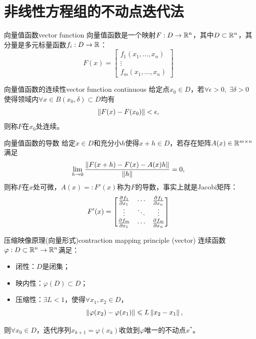 \section{非线性方程组的不动点迭代法}

\begin{definition}
    {向量值函数}{vector function}
    向量值函数是一个映射$F:D\to\mathbb R^n$，其中$D\subset\mathbb R^n$，其分量是多元标量函数$f_i:D\to\mathbb R$：
    \begin{equation}
        F(x)=\begin{bmatrix}
            f_1(x_1,\ldots,x_n)\\\vdots\\f_m(x_1,\ldots,x_n)
        \end{bmatrix}
    \end{equation}
\end{definition}

\begin{definition}
    {向量值函数的连续性}{vector function continuous}
    给定点$x_0\in D$，若$\forall\epsilon>0,\;\exists\delta>0$使得领域内$\forall x\in B(x_0,\delta)\subset D$均有
    \[
        \left\lVert F(x)-F(x_0)\right\rVert<\epsilon,
    \]
    则称$F$在$x_0$处连续。
\end{definition}

\begin{definition}
    {向量值函数的导数}{}
    给定$x\in D$和充分小$h$使得$x+h\in D$，若存在矩阵$A(x)\in\mathbb R^{m\times n}$满足 
    \begin{equation}
        \lim_{h\to 0}\frac{\left\lVert F(x+h)-F(x)-A(x)h\right\rVert}{\left\lVert h\right\rVert}=0,
    \end{equation}
    则称$F$在$x$处可微，$A(x)=:F'(x)$称为$F$的导数，事实上就是Jacobi矩阵：
    \begin{equation}
        F'(x)=\begin{bmatrix}
            \frac{\partial^{{}}f_1}{\partial{x_1}^{{}}}&\cdots&\frac{\partial^{{}}f_1}{\partial{x_n}^{{}}}\\
            \vdots&\ddots&\vdots\\
            \frac{\partial^{{}}f_m}{\partial{x_1}^{{}}}&\cdots&\frac{\partial^{{}}f_m}{\partial{x_n}^{{}}}
        \end{bmatrix}
    \end{equation}
\end{definition}

\begin{theorem}
    {压缩映像原理(向量形式)}{contraction mapping principle (vector)}
    连续函数$\varphi:D\subset\mathbb R^n\to\mathbb R^n$满足：
    \begin{itemize}
        \item 闭性：$D$是闭集；
        \item 映内性：$\varphi(D)\subset D$；
        \item 压缩性：$\exists L<1$，使得$\forall x_1,x_2\in D$，
        \[
            \left\lVert\varphi(x_2)-\varphi(x_1)\right\rVert\leqslant L\left\lVert x_2-x_1\right\rVert,
        \]
    \end{itemize}
    则$\forall x_0\in D$，迭代序列$x_{k+1}=\varphi(x_k)$收敛到$\varphi$唯一的不动点$x^*$。
\end{theorem}

